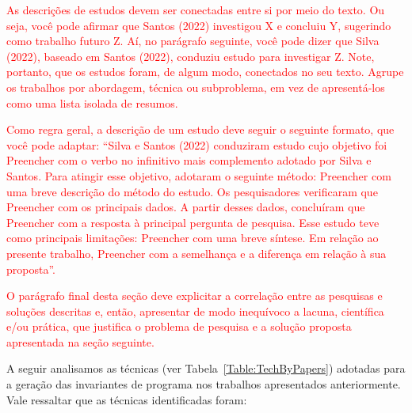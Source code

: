 \textcolor{red}{As descrições de estudos devem ser conectadas entre si por meio do texto. Ou seja, você pode afirmar que Santos (2022) investigou X e concluiu Y, sugerindo como trabalho futuro Z. Aí, no parágrafo seguinte, você pode dizer que Silva (2022), baseado em Santos (2022), conduziu estudo para investigar Z. Note, portanto, que os estudos foram, de algum modo, conectados no seu texto. Agrupe os trabalhos por abordagem, técnica ou subproblema, em vez de apresentá-los como uma lista isolada de resumos.}

\textcolor{red}{Como regra geral, a descrição de um estudo deve seguir o seguinte formato, que você pode adaptar: “Silva e Santos (2022) conduziram estudo cujo objetivo foi {Preencher com o verbo no infinitivo mais complemento adotado por Silva e Santos}. Para atingir esse objetivo, adotaram o seguinte método: {Preencher com uma breve descrição do método do estudo}. Os pesquisadores verificaram que {Preencher com os principais dados}. A partir desses dados, concluíram que {Preencher com a resposta à principal pergunta de pesquisa}. Esse estudo teve como principais limitações: {Preencher com uma breve síntese}. Em relação ao presente trabalho, {Preencher com a semelhança e a diferença em relação à sua proposta}”.}

\textcolor{red}{O parágrafo final desta seção deve explicitar a correlação entre as pesquisas e soluções descritas e, então, apresentar de modo inequívoco a lacuna, científica e/ou prática, que justifica o problema de pesquisa e a solução proposta apresentada na seção seguinte.}


A seguir analisamos as técnicas (ver Tabela~\ref{Table:TechByPapers}) 
adotadas para a geração das invariantes de programa nos trabalhos apresentados anteriormente. Vale ressaltar que as técnicas identificadas foram:

